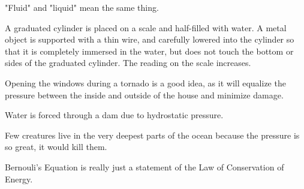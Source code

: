 \documentclass[10pt]{examdesign}
\begin{document}
\begin{truefalse}[title={True or False},
	rearrange=no]
\begin{question}
	  "Fluid" and "liquid" mean the same thing.
\end{question}

\begin{question}
	 A graduated cylinder is placed on a scale and half-filled with water.  A metal object is supported with a thin wire, and carefully lowered into the cylinder so that it is completely immersed in the water, but does not touch the bottom or sides of the graduated cylinder.  The reading on the scale increases. 
\end{question}

\begin{question}
	  Opening the windows during a tornado is a good idea, as it will equalize the pressure between the inside and outside of the house and minimize damage.
\end{question}


\begin{question}
	  Water is forced through a dam due to hydrostatic pressure.
\end{question}

\begin{question}
	  Few creatures live in the very deepest parts of the ocean because the pressure is so great, it would kill them. 
\end{question}

\begin{question}
	  Bernouli's Equation is really just a statement of the Law of Conservation of Energy. 
\end{question}



\end{truefalse}
\end{document}
